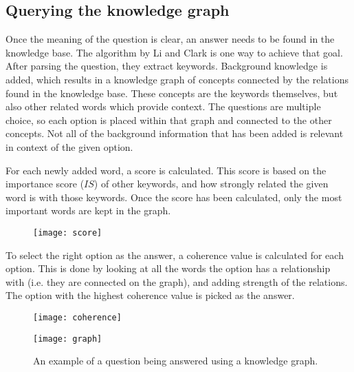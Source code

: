 \subsection{Querying the knowledge graph}
Once the meaning of the question is clear, an answer needs to be found in the knowledge base. The algorithm by Li and Clark \cite{sciencequestions} is one way to achieve that goal. After parsing the question, they extract keywords. Background knowledge is added, which results in a knowledge graph of concepts connected by the relations found in the knowledge base. These concepts are the keywords themselves, but also other related words which provide context. The questions are multiple choice, so each option is placed within that graph and connected to the other concepts. Not all of the background information that has been added is relevant in context of the given option.

 For each newly added word, a score is calculated. This score is based on the importance score ($IS$) of other keywords, and how strongly related the given word is with those keywords. Once the score has been calculated, only the most important words are kept in the graph.

\begin{figure}[H]
\texttt{[image: score]}
\end{figure}

To select the right option as the answer, a coherence value is calculated for each option. This is done by looking at all the words the option has a relationship with (i.e. they are connected on the graph), and adding strength of the relations. The option with the highest coherence value is picked as the answer.

\begin{figure}[H]
\texttt{[image: coherence]}
\end{figure}

\begin{figure}[H]
\texttt{[image: graph]}
\caption{An example of a question being answered using a knowledge graph.}\label{fig:parsetree}
\end{figure}





